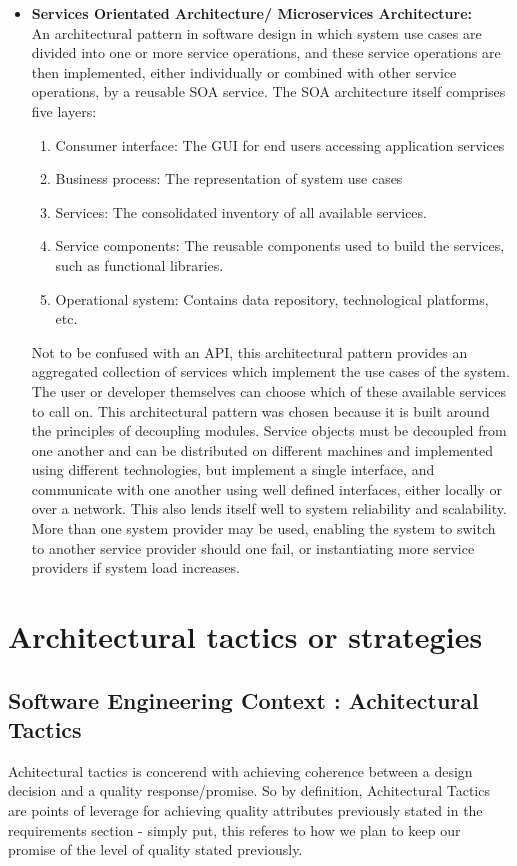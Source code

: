 \documentclass[a4paper,10pt]{article}
\begin{document}
\begin{itemize}
		\item \textbf{Services Orientated Architecture/ Microservices Architecture:}\\
		An architectural pattern in software design in which system use cases are divided into one or more service operations, and these service operations are then implemented, either individually or combined with other service operations, by a reusable SOA service. The SOA architecture itself comprises five layers:
		\begin{enumerate}
			\item Consumer interface: The GUI for end users accessing application services
			\item Business process: The representation of system use cases
			\item Services: The consolidated inventory of all available services.
			\item Service components: The reusable components used to build the services, such as functional libraries.
			\item Operational system: Contains data repository, technological platforms, etc.
		\end{enumerate}
		Not to be confused with an API, this architectural pattern provides an aggregated collection of services which implement the use cases of the system. The user or developer themselves can choose which of these available services to call on. This architectural pattern was chosen because it is built around the principles of decoupling modules. Service objects must be decoupled from one another and can be distributed on different machines and implemented using different technologies, but implement a single interface, and communicate with one another using well defined interfaces, either locally or over a network. This also lends itself well to system reliability and scalability. More than one system provider may be used, enabling the system to switch to another service provider should one fail, or instantiating more service providers if system load increases.
	\end{itemize}

\section{Architectural tactics or strategies}
\subsection{Software Engineering Context : Achitectural Tactics}
Achitectural tactics is concerend with achieving coherence between  a design decision and a quality response/promise. So by definition, Achitectural Tactics are points of leverage for achieving quality attributes previously stated in the requirements section - simply put, this referes to how we plan to keep our promise of the level of quality stated previously. 
\end{document}
